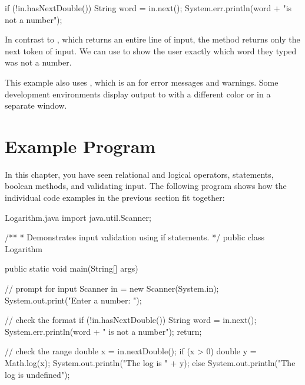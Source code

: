 \begin{code}
if (!in.hasNextDouble()) {
    String word = in.next();
    System.err.println(word + "is not a number");
}
\end{code}


In contrast to , which returns an entire line of input, the  method returns only the next token of input.
We can use  to show the user exactly which word they typed was not a number.


This example also uses , which is an  for error messages and warnings.
Some development environments display output to  with a different color or in a separate window.



\section{Example Program}

In this chapter, you have seen relational and logical operators,  statements, boolean methods, and validating input.
The following program shows how the individual code examples in the previous section fit together:


\begin{trinket}{Logarithm.java}
import java.util.Scanner;

/**
 * Demonstrates input validation using if statements.
 */
public class Logarithm {

    public static void main(String[] args) {

        // prompt for input
        Scanner in = new Scanner(System.in);
        System.out.print("Enter a number: ");

        // check the format
        if (!in.hasNextDouble()) {
            String word = in.next();
            System.err.println(word + " is not a number");
            return;
        }

        // check the range
        double x = in.nextDouble();
        if (x > 0) {
            double y = Math.log(x);
            System.out.println("The log is " + y);
        } else {
            System.out.println("The log is undefined");
        }
    }
}
\end{trinket}

